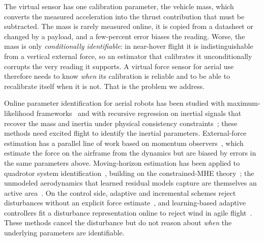 \documentclass{ieeeaccess}
\begin{document}
The virtual sensor has one calibration parameter, the vehicle mass, which converts
the measured acceleration into the thrust contribution that must be subtracted.
The mass is rarely measured online, it is copied from a datasheet or changed by a
payload, and a few-percent error biases the reading. Worse, the mass is only
\emph{conditionally identifiable}: in near-hover flight it is indistinguishable
from a vertical external force, so an estimator that calibrates it unconditionally
corrupts the very reading it supports. A virtual force sensor for aerial use therefore needs
to know \emph{when} its calibration is reliable and to be able to recalibrate
itself when it is not. That is the problem we address.

Online parameter identification for aerial robots has been studied with
maximum-likelihood frameworks~\cite{burri2018system} and with recursive
regression on inertial signals that recover the mass and inertia under physical
consistency constraints~\cite{wuest2019online,wensing2017geometric}; these
methods need excited flight to identify the inertial parameters. External-force
estimation has a parallel line of work based on momentum
observers~\cite{tomic2017external,ruggiero2014impedance,yuksel2014nonlinear,guevara2024estimation}, which estimate the
force on the airframe from the dynamics but are biased by errors in the same
parameters above. Moving-horizon estimation has been applied to quadrotor system
identification~\cite{wang2023neuromhe}, building on the constrained-MHE
theory~\cite{rao2003constrained}; the unmodeled aerodynamics that learned
residual models capture are themselves an active
area~\cite{bauersfeld2021neurobem,torrente2021data}. On the control side,
adaptive and incremental schemes reject disturbances without an explicit force
estimate~\cite{smeur2016adaptive,hanover2022performance,chen2016disturbance,zhang2024enhanced,liu2023adaptive}, and learning-based adaptive controllers fit a
disturbance representation online to reject wind in agile
flight~\cite{oconnell2022neuralfly}. These methods cancel the disturbance but do
not reason about \emph{when} the underlying parameters are identifiable.
\end{document}
